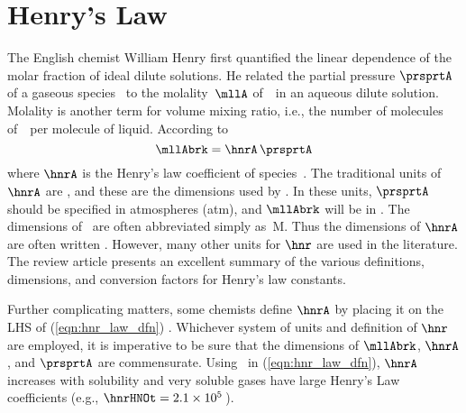 \documentclass[12pt,twoside]{book}
\begin{document}
\section{Henry's Law}
The English chemist William Henry first quantified the linear
dependence of the molar fraction of ideal dilute solutions.
He related the partial pressure $\prsprtA$ of a gaseous species \A\
to the molality~$\mllA$ of~\A\ in an aqueous dilute solution.
Molality is another term for volume mixing ratio, i.e., the number of
molecules of~\A\ per molecule of liquid.
According to 
\begin{equation}
\mllAbrk = \hnrA \, \prsprtA
\label{eqn:hnr_law_dfn}
\end{equation}
where $\hnrA$ is the Henry's law coefficient of species~\A.
The traditional units of $\hnrA$ are \molxlatm, and these are the
dimensions used by \cite{SeP97}.
In these units, $\prsprtA$ should be specified in atmospheres (atm),
and $\mllAbrk$ will be in \molxl.
The dimensions of \molxl\ are often abbreviated simply as~M.
Thus the dimensions of $\hnrA$ are often written \Mxatm.
However, many other units for $\hnr$ are used in the literature. 
The review article \cite{San991} presents an excellent summary of the
various definitions, dimensions, and conversion factors for Henry's
law constants.

Further complicating matters, some chemists define $\hnrA$ by placing
it on the LHS of (\ref{eqn:hnr_law_dfn}) \cite[e.g.,][]{Atk90}.
Whichever system of units and definition of $\hnr$ are employed, it is
imperative to be sure that the dimensions of $\mllAbrk$, $\hnrA$, and
$\prsprtA$ are commensurate. 
Using \molxlatm\ in (\ref{eqn:hnr_law_dfn}), $\hnrA$ increases with
solubility and very soluble gases have large Henry's Law coefficients 
(e.g., $\hnrHNOt = 2.1 \times 10^{5}$\,\molxlatm). 
\end{document}
